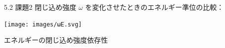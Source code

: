 \documentclass{beamer}
\begin{document}
\begin{frame}{5.2 課題2}
閉じ込め強度 $\omega$ を変化させたときのエネルギー準位の比較：

\begin{center}
\texttt{[image: images/ωE.svg]}

エネルギーの閉じ込め強度依存性
\end{center}
\end{frame}
\end{document}
